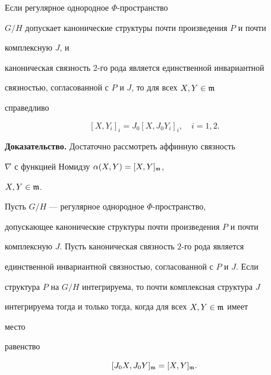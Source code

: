  


\begin{cornonum} Если регулярное однородное $\Phi$-пространство 


$G/H$ допускает канонические структуры почти произведения $P$ и почти 


комплексную $J$, и 


каноническая связность 2-го рода является единственной инвариантной 


связностью, согласованной с $P$ и $J$, то для всех $X,Y\in\frak m$ 


справедливо 


\begin{equation} 


[X,Y_i]_i=J_0[X,J_0Y_i]_i,\quad i=1,2. 


\end{equation} 


\end{cornonum} 


 


{\bf Доказательство.} Достаточно рассмотреть аффинную связность 


$\nabla$ с функцией Номидзу $\alpha(X,Y)=[X,Y]_{\frak m}$, 


$X,Y\in\frak m$. 


 


\begin{thm} Пусть $G/H$ --- регулярное однородное $\Phi$-пространство, 


допускающее канонические структуры почти произведения $P$ и почти 


комплексную $J$. Пусть каноническая связность $2$-го рода является 


единственной инвариантной связностью, согласованной с $P$ и $J$. Если 


структура $P$ на $G/H$ интегрируема, то почти комплексная структура $J$ 


интегрируема тогда и только тогда, когда для всех $X,Y\in\frak m$ имеет 


место 


равенство 


$$ 


[J_0X,J_0Y]_{\frak m}=[X,Y]_{\frak m}. 


$$ 


\end{thm} 


 


